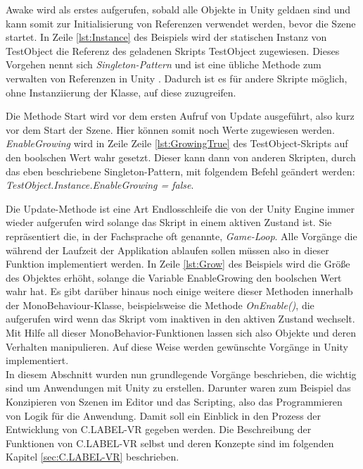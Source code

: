 Awake wird als erstes aufgerufen, sobald alle Objekte in Unity geldaen sind und kann somit zur Initialisierung von Referenzen verwendet werden, bevor die Szene startet. In Zeile \ref{lst:Instance} des Beispiels wird der statischen Instanz von TestObject die Referenz des geladenen Skripts TestObject zugewiesen. Dieses Vorgehen nennt sich \textit{Singleton-Pattern} und ist eine übliche Methode zum verwalten von Referenzen in Unity \cite{bib:Singleton}. Dadurch ist es für andere Skripte möglich, ohne Instanziierung der Klasse, auf diese zuzugreifen.

Die Methode Start wird vor dem ersten Aufruf von Update ausgeführt, also kurz vor dem Start der Szene. Hier können somit noch Werte zugewiesen werden. \textit{EnableGrowing} wird in Zeile Zeile \ref{lst:GrowingTrue} des TestObject-Skripts auf den boolschen Wert \glqq wahr\grqq{} gesetzt. Dieser kann dann von anderen Skripten, durch das eben beschriebene Singleton-Pattern, mit folgendem Befehl geändert werden: \textit{TestObject.Instance.EnableGrowing = false}.  

Die Update-Methode ist eine Art Endlosschleife die von der Unity Engine immer wieder aufgerufen wird solange das Skript in einem aktiven Zustand ist. Sie repräsentiert die, in der Fachsprache oft genannte, \textit{Game-Loop}. Alle Vorgänge die während der Laufzeit der Applikation ablaufen sollen müssen also in dieser Funktion implementiert werden. In Zeile \ref{lst:Grow} des Beispiels wird die Größe des Objektes erhöht, solange die Variable EnableGrowing den boolschen Wert \glqq wahr\grqq{} hat. Es gibt darüber hinaus noch einige weitere dieser Methoden innerhalb der MonoBehaviour-Klasse, beispielsweise die Methode \textit{OnEnable()}, die aufgerufen wird wenn das Skript vom inaktiven in den aktiven Zustand wechselt. Mit Hilfe all dieser MonoBehavior-Funktionen lassen sich also Objekte und deren Verhalten manipulieren. Auf diese Weise werden gewünschte Vorgänge in Unity implementiert.\\

In diesem Abschnitt wurden nun grundlegende Vorgänge beschrieben, die wichtig sind um Anwendungen mit Unity zu erstellen. Darunter waren zum Beispiel das Konzipieren von Szenen im Editor und das Scripting, also das Programmieren von Logik für die Anwendung. Damit soll ein Einblick in den Prozess der Entwicklung von C.LABEL-VR gegeben werden. Die Beschreibung der Funktionen von C.LABEL-VR selbst und deren Konzepte sind im folgenden Kapitel \ref{sec:C.LABEL-VR} beschrieben. 


